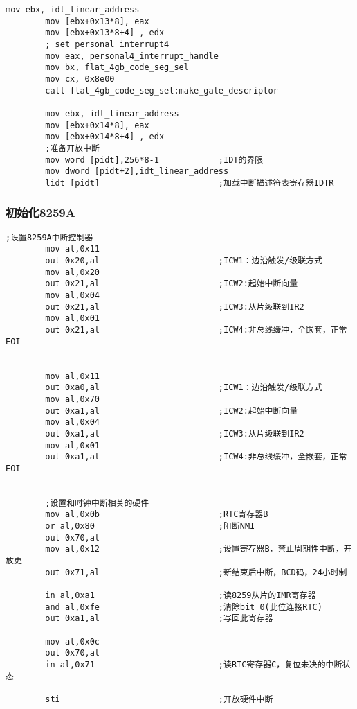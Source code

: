 \documentclass[a4paper,11pt,UTF8]{ctexart}
\begin{document}
\begin{lstlisting}[caption={安装 IDT},tabsize=4,basicstyle=\footnotesize,captionpos=b]
		mov ebx, idt_linear_address
		mov [ebx+0x13*8], eax
		mov [ebx+0x13*8+4] , edx
		; set personal interrupt4
		mov eax, personal4_interrupt_handle
		mov bx, flat_4gb_code_seg_sel
		mov cx, 0x8e00
		call flat_4gb_code_seg_sel:make_gate_descriptor

		mov ebx, idt_linear_address
		mov [ebx+0x14*8], eax
		mov [ebx+0x14*8+4] , edx
		;准备开放中断
		mov word [pidt],256*8-1            ;IDT的界限
		mov dword [pidt+2],idt_linear_address
		lidt [pidt]                        ;加载中断描述符表寄存器IDTR

	\end{lstlisting}

		\subsubsection{初始化8259A}
	\begin{lstlisting}[caption={初始化8259A},tabsize=4,basicstyle=\footnotesize,captionpos=b]
		;设置8259A中断控制器
		mov al,0x11
		out 0x20,al                        ;ICW1：边沿触发/级联方式
		mov al,0x20
		out 0x21,al                        ;ICW2:起始中断向量
		mov al,0x04
		out 0x21,al                        ;ICW3:从片级联到IR2
		mov al,0x01
		out 0x21,al                        ;ICW4:非总线缓冲，全嵌套，正常EOI


		mov al,0x11
		out 0xa0,al                        ;ICW1：边沿触发/级联方式
		mov al,0x70
		out 0xa1,al                        ;ICW2:起始中断向量
		mov al,0x04
		out 0xa1,al                        ;ICW3:从片级联到IR2
		mov al,0x01
		out 0xa1,al                        ;ICW4:非总线缓冲，全嵌套，正常EOI


		;设置和时钟中断相关的硬件 
		mov al,0x0b                        ;RTC寄存器B
		or al,0x80                         ;阻断NMI
		out 0x70,al
		mov al,0x12                        ;设置寄存器B，禁止周期性中断，开放更
		out 0x71,al                        ;新结束后中断，BCD码，24小时制

		in al,0xa1                         ;读8259从片的IMR寄存器
		and al,0xfe                        ;清除bit 0(此位连接RTC)
		out 0xa1,al                        ;写回此寄存器

		mov al,0x0c
		out 0x70,al
		in al,0x71                         ;读RTC寄存器C，复位未决的中断状态

		sti                                ;开放硬件中断

	\end{lstlisting}
\end{document}
